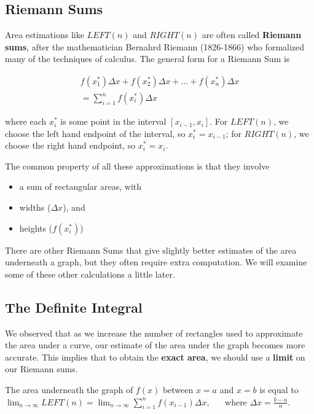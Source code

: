 \subsection*{Riemann Sums}

Area estimations like $LEFT(n)$ and $RIGHT(n)$ are often called {\bf
  Riemann sums}, after the mathematician Bernahrd Riemann (1826-1866)
who formalized many of the techniques of calculus.  The general form
for a Riemann Sum is

\begin{align*}
 f(x_{1}^{*}) \Delta x+ f(x_{2}^{*}) \Delta x + \ldots + f(x_{n}^{*}) \Delta x 
 \\ = \displaystyle\sum_{i=1}^{n} f(x_{i}^{*})\Delta x
\end{align*}

where each $x_{i}^{*}$ is some point in the interval $[x_{i-1},
x_{i}]$.  For $LEFT(n)$, we choose the left hand endpoint of the
interval, so $x_{i}^* = x_{i-1}$; for $RIGHT(n)$, we choose the right
hand endpoint, so $x_{i}^* = x_{i}$.  \newpage 

The common property of all these
approximations is that they involve
\begin{itemize}
\item a sum of rectangular areas, with \\[1ex]
\item widths ($\Delta x$), and \\[1ex]
\item heights ($f(x_i^*)$)
\end{itemize}



There are other Riemann Sums that give slightly better estimates of
the area underneath a graph, but they often require extra computation.
We will examine some of these other calculations a little later.

\newpage

\subsection*{The Definite Integral}

We observed that as we increase the number of rectangles used to
approximate the area under a curve, our estimate of the area under the
graph becomes more accurate.  This implies that to obtain the {\bf
  exact area}, we should use a {\bf limit} on our Riemann sums.

\medskip
\begin{center}
The area underneath the graph of $f(x)$ between $x=a$ and $x=b$ is equal to $\displaystyle\lim_{n \to \infty} LEFT(n) = 
\displaystyle\lim_{n \to \infty} \displaystyle\sum_{i=1}^{n} f(x_{i-1})\Delta x$, ~~~where $\Delta x = \displaystyle\frac{b-a}{n}$.
\end{center}

